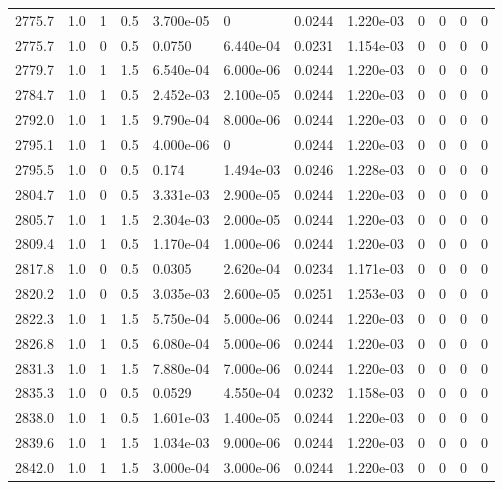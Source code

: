 \documentclass[preview]{standalone}
\begin{document}
{{{{{{{{{{{{{{{{\begin{tabular}{L{1.2cm}C{1.2cm} C{0.3cm}C{0.5cm} C{1.4cm}C{1.4cm} C{1.4cm}C{1.4cm} C{1.6cm}C{1.6cm} C{1.6cm}C{1.6cm}}
  2775.7  &   1.0  & 1     & 0.5 &  3.700e-05  & 0  &  0.0244&   1.220e-03& 0 & 0   &  0 & 0  \\ 
  2775.7  &   1.0  & 0     & 0.5 &  0.0750  & 6.440e-04  &  0.0231&   1.154e-03& 0 & 0   &  0 & 0  \\ 
  2779.7  &   1.0  & 1     & 1.5 &  6.540e-04  & 6.000e-06  &  0.0244&   1.220e-03& 0 & 0   &  0 & 0  \\ 
  2784.7  &   1.0  & 1     & 0.5 &  2.452e-03  & 2.100e-05  &  0.0244&   1.220e-03& 0 & 0   &  0 & 0  \\ 
  2792.0  &   1.0  & 1     & 1.5 &  9.790e-04  & 8.000e-06  &  0.0244&   1.220e-03& 0 & 0   &  0 & 0  \\ 
  2795.1  &   1.0  & 1     & 0.5 &  4.000e-06  & 0  &  0.0244&   1.220e-03& 0 & 0   &  0 & 0  \\ 
  2795.5  &   1.0  & 0     & 0.5 &  0.174  & 1.494e-03  &  0.0246&   1.228e-03& 0 & 0   &  0 & 0  \\ 
  2804.7  &   1.0  & 0     & 0.5 &  3.331e-03  & 2.900e-05  &  0.0244&   1.220e-03& 0 & 0   &  0 & 0  \\ 
  2805.7  &   1.0  & 1     & 1.5 &  2.304e-03  & 2.000e-05  &  0.0244&   1.220e-03& 0 & 0   &  0 & 0  \\ 
  2809.4  &   1.0  & 1     & 0.5 &  1.170e-04  & 1.000e-06  &  0.0244&   1.220e-03& 0 & 0   &  0 & 0  \\ 
  2817.8  &   1.0  & 0     & 0.5 &  0.0305  & 2.620e-04  &  0.0234&   1.171e-03& 0 & 0   &  0 & 0  \\ 
  2820.2  &   1.0  & 0     & 0.5 &  3.035e-03  & 2.600e-05  &  0.0251&   1.253e-03& 0 & 0   &  0 & 0  \\ 
  2822.3  &   1.0  & 1     & 1.5 &  5.750e-04  & 5.000e-06  &  0.0244&   1.220e-03& 0 & 0   &  0 & 0  \\ 
  2826.8  &   1.0  & 1     & 0.5 &  6.080e-04  & 5.000e-06  &  0.0244&   1.220e-03& 0 & 0   &  0 & 0  \\ 
  2831.3  &   1.0  & 1     & 1.5 &  7.880e-04  & 7.000e-06  &  0.0244&   1.220e-03& 0 & 0   &  0 & 0  \\ 
  2835.3  &   1.0  & 0     & 0.5 &  0.0529  & 4.550e-04  &  0.0232&   1.158e-03& 0 & 0   &  0 & 0  \\ 
  2838.0  &   1.0  & 1     & 0.5 &  1.601e-03  & 1.400e-05  &  0.0244&   1.220e-03& 0 & 0   &  0 & 0  \\ 
  2839.6  &   1.0  & 1     & 1.5 &  1.034e-03  & 9.000e-06  &  0.0244&   1.220e-03& 0 & 0   &  0 & 0  \\ 
  2842.0  &   1.0  & 1     & 1.5 &  3.000e-04  & 3.000e-06  &  0.0244&   1.220e-03& 0 & 0   &  0 & 0  \\ 

\end{tabular}}}}}}}}}}}}}}}}}
\end{document}
